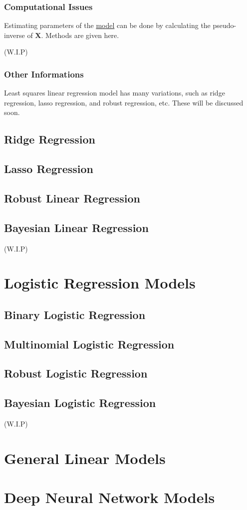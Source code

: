 \documentclass{article}
\begin{document}
        \subsubsection{Computational Issues}
            Estimating parameters of the \hyperref[defn:LSLR]{model} can be done by calculating the pseudo-inverse of $\textbf{X}$. Methods are given here.

            (W.I.P)
        
        \subsubsection{Other Informations}
            
            Least squares linear regression model has many variations, such as ridge regression, lasso regression, and robust regression, etc.
            These will be discussed soon.

    \subsection{Ridge Regression}
    \subsection{Lasso Regression}
    \subsection{Robust Linear Regression}
    \subsection{Bayesian Linear Regression}

    (W.I.P)

\section{Logistic Regression Models}

    \subsection{Binary Logistic Regression}
    \subsection{Multinomial Logistic Regression}
    \subsection{Robust Logistic Regression}
    \subsection{Bayesian Logistic Regression}

    (W.I.P)

\section{General Linear Models}

\section{Deep Neural Network Models}
\end{document}

